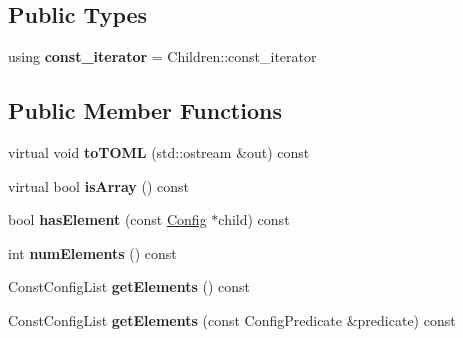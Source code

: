 \subsection*{Public Types}
\begin{DoxyCompactItemize}
\item 
\mbox{\label{classtheoria_1_1config_1_1ConfigArray_ace80948768681e7eb033825f4fe761f2}} 
using {\bfseries const\+\_\+iterator} = Children\+::const\+\_\+iterator
\end{DoxyCompactItemize}
\subsection*{Public Member Functions}
\begin{DoxyCompactItemize}
\item 
\mbox{\label{classtheoria_1_1config_1_1ConfigArray_a1c73dba526ebd747682bc961676f5158}} 
virtual void {\bfseries to\+T\+O\+ML} (std\+::ostream \&out) const
\item 
\mbox{\label{classtheoria_1_1config_1_1ConfigArray_aa225cf405229bccfcfdf2042e44da4f7}} 
virtual bool {\bfseries is\+Array} () const
\item 
\mbox{\label{classtheoria_1_1config_1_1ConfigArray_a21700ff304de1c383f7e40dc6bd72cdf}} 
bool {\bfseries has\+Element} (const \hyperlink{classtheoria_1_1config_1_1Config}{Config} $\ast$child) const
\item 
\mbox{\label{classtheoria_1_1config_1_1ConfigArray_a8482627e5891b1c15f177f5118ec484d}} 
int {\bfseries num\+Elements} () const
\item 
\mbox{\label{classtheoria_1_1config_1_1ConfigArray_a91bf929f72cc8eeb399df049c5008898}} 
Const\+Config\+List {\bfseries get\+Elements} () const
\item 
\mbox{\label{classtheoria_1_1config_1_1ConfigArray_a45cf4c898888e5ec602d4f21ab603687}} 
Const\+Config\+List {\bfseries get\+Elements} (const Config\+Predicate \&predicate) const

\end{DoxyCompactItemize}
